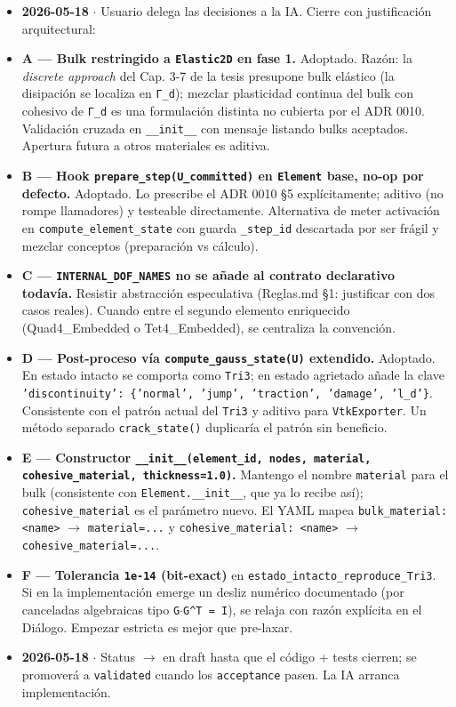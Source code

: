 \documentclass[11pt,letterpaper,oneside]{report}
\begin{document}
\begin{itemize}
  \item \textbf{2026-05-18} \ensuremath{\cdot} Usuario delega las decisiones a la IA. Cierre con justificación arquitectural:
  \item \textbf{A --- Bulk restringido a \texttt{Elastic2D} en fase 1.} Adoptado. Razón: la \textit{discrete approach} del Cap. 3-7 de la tesis presupone bulk elástico (la disipación se localiza en \texttt{Γ\_d}); mezclar plasticidad continua del bulk con cohesivo de \texttt{Γ\_d} es una formulación distinta no cubierta por el ADR 0010. Validación cruzada en \texttt{\_\_init\_\_} con mensaje listando bulks aceptados. Apertura futura a otros materiales es aditiva.
  \item \textbf{B --- Hook \texttt{prepare\_step(U\_committed)} en \texttt{Element} base, no-op por defecto.} Adoptado. Lo prescribe el ADR 0010 §5 explícitamente; aditivo (no rompe llamadores) y testeable directamente. Alternativa de meter activación en \texttt{compute\_element\_state} con guarda \texttt{\_step\_id} descartada por ser frágil y mezclar conceptos (preparación vs cálculo).
  \item \textbf{C --- \texttt{INTERNAL\_DOF\_NAMES} no se añade al contrato declarativo todavía.} Resistir abstracción especulativa (Reglas.md §1: justificar con dos casos reales). Cuando entre el segundo elemento enriquecido (Quad4\_Embedded o Tet4\_Embedded), se centraliza la convención.
  \item \textbf{D --- Post-proceso vía \texttt{compute\_gauss\_state(U)} extendido.} Adoptado. En estado intacto se comporta como \texttt{Tri3}; en estado agrietado añade la clave \texttt{'discontinuity': \{'normal', 'jump', 'traction', 'damage', 'l\_d'\}}. Consistente con el patrón actual del \texttt{Tri3} y aditivo para \texttt{VtkExporter}. Un método separado \texttt{crack\_state()} duplicaría el patrón sin beneficio.
  \item \textbf{E --- Constructor \texttt{\_\_init\_\_(element\_id, nodes, material, cohesive\_material, thickness=1.0)}.} Mantengo el nombre \texttt{material} para el bulk (consistente con \texttt{Element.\_\_init\_\_}, que ya lo recibe así); \texttt{cohesive\_material} es el parámetro nuevo. El YAML mapea \texttt{bulk\_material: <name>} \ensuremath{\to} \texttt{material=...} y \texttt{cohesive\_material: <name>} \ensuremath{\to} \texttt{cohesive\_material=...}.
  \item \textbf{F --- Tolerancia \texttt{1e-14} (bit-exact)} en \texttt{estado\_intacto\_reproduce\_Tri3}. Si en la implementación emerge un desliz numérico documentado (por canceladas algebraicas tipo \texttt{G\ensuremath{\cdot}G\textasciicircum{}T = I}), se relaja con razón explícita en el Diálogo. Empezar estricta es mejor que pre-laxar.
  \item \textbf{2026-05-18} \ensuremath{\cdot} Status \ensuremath{\to} en draft hasta que el código + tests cierren; se promoverá a \texttt{validated} cuando los \texttt{acceptance} pasen. La IA arranca implementación.
\end{itemize}
\end{document}
